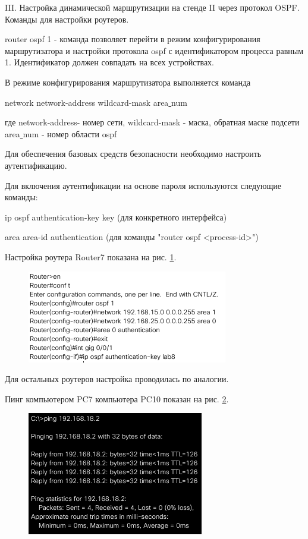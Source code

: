 \documentclass[a4paper,14pt]{extreport} %
\begin{document}
III. Настройка динамической маршрутизации на
стенде II через протокол OSPF.
\\

Команды для настройки роутеров.

router ospf 1 - команда позволяет перейти в режим конфигурирования маршрутизатора и настройки протокола ospf с идентификатором процесса равным 1. Идентификатор должен совпадать на всех устройствах.

В режиме конфигурирования маршрутизатора выполняется команда

network network-address wildcard-mask area\underline{ }num

где network-address- номер сети, 
wildcard-mask - маска, обратная маске подсети
area\underline{ }num - номер области ospf

Для обеспечения базовых средств безопасности необходимо настроить аутентификацию. 

Для включения аутентификации на основе пароля используются следующие команды:

ip ospf authentication-key key (для конкретного интерфейса)

area area-id authentication (для команды "router ospf <process-id>")

Настройка роутера Router7 показана на рис. \ref{fig:rout}.

\begin{figure}[H]
	\centering
	\includegraphics[width=0.7\linewidth]{rout}
	\caption{}
	\label{fig:rout}
\end{figure}

Для остальных роутеров настройка проводилась по аналогии.

Пинг компьютером PC7 компьютера PC10 показан на рис. \ref{fig:ping3}.

\begin{figure}[H]
	\centering
	\includegraphics[width=0.7\linewidth]{ping3}
	\caption{}
	\label{fig:ping3}
\end{figure}
\end{document}
